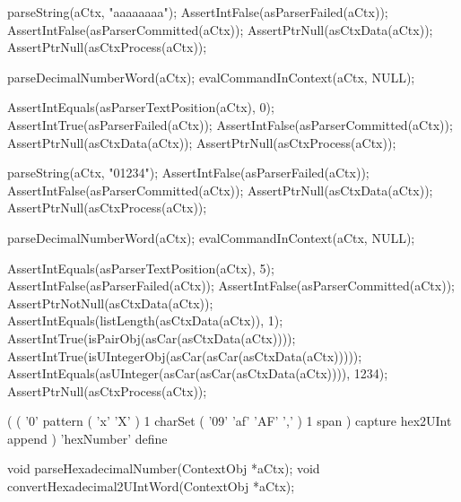 \startCTest
  parseString(aCtx, "aaaaaaaa");
  AssertIntFalse(asParserFailed(aCtx));
  AssertIntFalse(asParserCommitted(aCtx));
  AssertPtrNull(asCtxData(aCtx));
  AssertPtrNull(asCtxProcess(aCtx));
  
  parseDecimalNumberWord(aCtx);
  evalCommandInContext(aCtx, NULL);
  
  AssertIntEquals(asParserTextPosition(aCtx), 0);
  AssertIntTrue(asParserFailed(aCtx));
  AssertIntFalse(asParserCommitted(aCtx));
  AssertPtrNull(asCtxData(aCtx));
  AssertPtrNull(asCtxProcess(aCtx));
\stopCTest
\stopTestCase

\startCTest
  parseString(aCtx, "01234");
  AssertIntFalse(asParserFailed(aCtx));
  AssertIntFalse(asParserCommitted(aCtx));
  AssertPtrNull(asCtxData(aCtx));
  AssertPtrNull(asCtxProcess(aCtx));
  
  parseDecimalNumberWord(aCtx);
  evalCommandInContext(aCtx, NULL);

  AssertIntEquals(asParserTextPosition(aCtx), 5);
  AssertIntFalse(asParserFailed(aCtx));
  AssertIntFalse(asParserCommitted(aCtx));
  AssertPtrNotNull(asCtxData(aCtx));
  AssertIntEquals(listLength(asCtxData(aCtx)), 1);
  AssertIntTrue(isPairObj(asCar(asCtxData(aCtx))));
  AssertIntTrue(isUIntegerObj(asCar(asCar(asCtxData(aCtx)))));
  AssertIntEquals(asUInteger(asCar(asCar(asCtxData(aCtx)))), 1234);  
  AssertPtrNull(asCtxProcess(aCtx));
\stopCTest
\stopTestCase
\stopTestSuite

\startTestSuite[parseHexNumberWord]

\starttyping
(
  (
    '0' pattern
    ( 'x' 'X' ) 1 charSet
    ( '09' 'af' 'AF' ',' ) 1 span
  ) capture hex2UInt append
) 'hexNumber' define
\stoptyping

\startCHeader
void parseHexadecimalNumber(ContextObj *aCtx);
void convertHexadecimal2UIntWord(ContextObj *aCtx);
\stopCHeader

